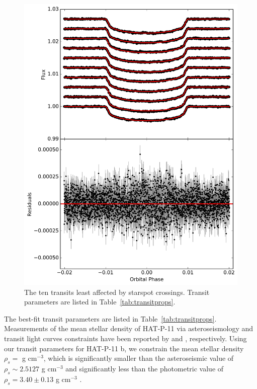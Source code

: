 \documentclass[iop]{emulateapj}
\begin{document}
\begin{figure}
\centering
\includegraphics[scale=0.42]{figures/hat11_spotless_transits_compact.png}
\caption{The ten transits least affected by starspot crossings. Transit parameters are listed in Table~\ref{tab:transitprops}.}
\label{fig:spotlesstransits}
\end{figure}


The best-fit transit parameters are listed in Table~\ref{tab:transitprops}. Measurements of the mean stellar density of HAT-P-11 via asteroseismology and transit light curves constraints have been reported by \citet{Christensen-Dalsgaard2010} and \citet{Southworth2011}, respectively. Using our transit parameters for HAT-P-11 b, we constrain the mean stellar density $\rho_s = $ g cm$^{-3}$, which is significantly smaller than the asteroseismic value of $\rho_s \sim 2.5127$ g cm$^{-3}$ \citet{Christensen-Dalsgaard2010} and significantly less than the photometric value of $\rho_s = 3.40 \pm 0.13$ g cm$^{-3}$ \citet{Southworth2011}.
\end{document}
